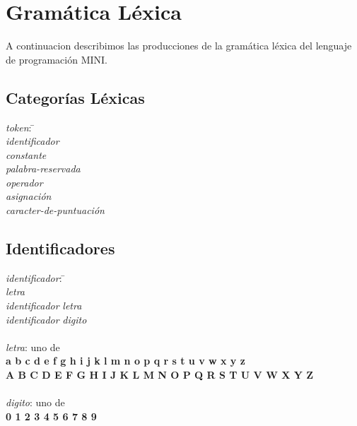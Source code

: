 
\section{Gramática Léxica}

A continuacion describimos las producciones de la gramática léxica del lenguaje de programación MINI.

\subsection{Categorías Léxicas}

\begin{tabbing}

\textit{token}: \= \+ \\
    \textit{identificador} \\
    \textit{constante}\\
    \textit{palabra-reservada} \\
    \textit{operador} \\
    \textit{asignación} \\
    \textit{caracter-de-puntuación}

\end{tabbing}

\subsection{Identificadores}

\begin{tabbing}

\textit{identificador}: \= \+ \\
    \textit{letra} \\
    \textit{identificador} \textit{letra} \\
    \textit{identificador} \textit{digito} \\

\- \\
\textit{letra}: uno de \+ \\
    \textbf{a b c d e f g h i j k l m n o p q r s t u v w x y z}\\
    \textbf{A B C D E F G H I J K L M N O P Q R S T U V W X Y Z} \\

\- \\
\textit{digito}: uno de \+ \\
    \textbf{0 1 2 3 4 5 6 7 8 9}

\end{tabbing}

